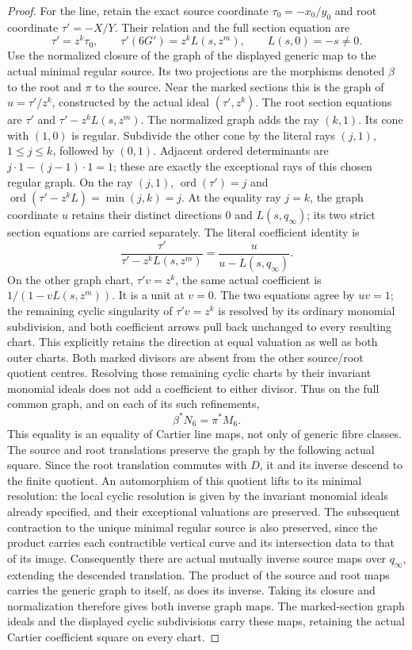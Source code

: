 \begin{proof}
For the line, retain the exact source coordinate
\(\tau_0=-x_0/y_0\) and root coordinate \(\tau'=-X/Y\).
Their relation and the full section equation are
\[
 \tau'=z^k\tau_0,\qquad
 \tau'(6G')=z^k L(s,z^m),\qquad L(s,0)=-s\ne0.
 \tag{EX.10}
\]
Use the normalized closure of the graph of the displayed generic
map to the actual minimal regular source. Its two projections
are the morphisms denoted \(\beta\) to the root and \(\pi\)
to the source. Near the marked sections this is the graph of
\(u=\tau'/z^k\), constructed by the actual ideal
\((\tau',z^k)\). The root section equations are
\(\tau'\) and \(\tau'-z^kL(s,z^m)\). The normalized graph adds the ray \((k,1)\). Its cone with
\((1,0)\) is regular. Subdivide the other cone by the literal
rays \((j,1)\), \(1\le j\le k\), followed by \((0,1)\).
Adjacent ordered determinants are
\(j\cdot1-(j-1)\cdot1=1\); these are exactly the exceptional
rays of this chosen regular graph. On the ray \((j,1)\),
\(\operatorname{ord}(\tau')=j\) and
\(\operatorname{ord}(\tau'-z^kL)=\min(j,k)=j\).
At the equality ray \(j=k\),
the graph coordinate \(u\) retains their distinct directions
\(0\) and \(L(s,q_\infty)\); its two strict section equations
are carried separately. The literal coefficient identity is
\[
 \frac{\tau'}{\tau'-z^kL(s,z^m)}
       =\frac{u}{u-L(s,q_\infty)}.
 \tag{EX.11}
\]
On the other graph chart, \(\tau'v=z^k\), the same actual
coefficient is \(1/(1-vL(s,z^m))\). It is a unit at \(v=0\).
The two equations agree by \(uv=1\); the remaining cyclic
singularity of \(\tau'v=z^k\) is resolved by its ordinary
monomial subdivision, and both coefficient arrows pull back
unchanged to every resulting chart. This explicitly retains
the direction at equal valuation as well as both outer charts.
Both marked divisors are absent from the other source/root
quotient centres. Resolving those remaining cyclic charts by
their invariant monomial ideals does not add a coefficient to
either divisor. Thus on the full common graph, and on each of
its such refinements,
\[
                \beta^*N_6=\pi^*M_6.
 \tag{EX.12}
\]
This equality is an equality of Cartier line maps, not only of
generic fibre classes. The source and root translations preserve the graph by the
following actual square. Since the root translation commutes with
\(D\), it and its inverse descend to the finite quotient. An automorphism
of this quotient lifts to its minimal resolution: the local cyclic
resolution is given by the invariant monomial ideals already
specified, and their exceptional valuations are preserved. The
subsequent contraction to the unique minimal regular source is
also preserved, since the product carries each contractible
vertical curve and its intersection data to that of its image.
Consequently there are actual mutually inverse source maps over
\(q_\infty\), extending the descended translation. The product of the
source and root maps carries the generic graph to itself, as does
its inverse. Taking its closure and normalization therefore gives
both inverse graph maps. The marked-section graph ideals and the
displayed cyclic subdivisions carry these maps, retaining the
actual Cartier coefficient square on every chart.


\end{proof}
